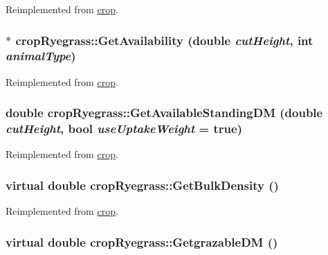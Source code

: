 Reimplemented from \hyperlink{classcrop_aaacb9f08e608ce328d60a25813a49ca5}{crop}.\hypertarget{classcrop_ryegrass_a3907b56b9f463da7667d89f726543ef5}{
\subsubsection[{GetAvailability}]{ $\ast$ cropRyegrass::GetAvailability (double {\em cutHeight}, \/  int {\em animalType})}}
\label{classcrop_ryegrass_a3907b56b9f463da7667d89f726543ef5}


Reimplemented from \hyperlink{classcrop_a066047061cd93c3ae3e798d66dc002fb}{crop}.\hypertarget{classcrop_ryegrass_a4bf3812ba96c183f5ff8b671d8ee9d85}{
\subsubsection[{GetAvailableStandingDM}]{\setlength{\rightskip}{0pt plus 5cm}double cropRyegrass::GetAvailableStandingDM (double {\em cutHeight}, \/  bool {\em useUptakeWeight} = {\ttfamily true})}}
\label{classcrop_ryegrass_a4bf3812ba96c183f5ff8b671d8ee9d85}


Reimplemented from \hyperlink{classcrop_ac48847f64021da9cd0c2dac80d6b7849}{crop}.\hypertarget{classcrop_ryegrass_af6202e05ea5e0c9b91acd3deea308a24}{
\subsubsection[{GetBulkDensity}]{\setlength{\rightskip}{0pt plus 5cm}virtual double cropRyegrass::GetBulkDensity ()}}
\label{classcrop_ryegrass_af6202e05ea5e0c9b91acd3deea308a24}


Reimplemented from \hyperlink{classcrop_a9346991c7b35dd7767dec41314a26274}{crop}.\hypertarget{classcrop_ryegrass_ae0b4f4270bb1cc5d47751bb999816ad7}{
\subsubsection[{GetgrazableDM}]{\setlength{\rightskip}{0pt plus 5cm}virtual double cropRyegrass::GetgrazableDM ()}}
\label{classcrop_ryegrass_ae0b4f4270bb1cc5d47751bb999816ad7}



